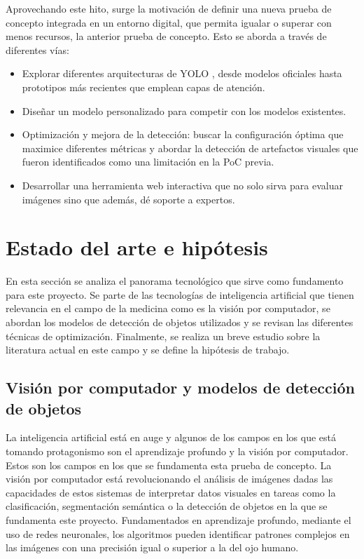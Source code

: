 \documentclass[12pt,a4paper,onecolumn,oneside]{report}
\begin{document}
Aprovechando este hito, surge la motivación de definir una nueva prueba de concepto integrada en un entorno digital, que permita igualar o superar con menos recursos, la anterior prueba de concepto. Esto se aborda a través de diferentes vías:

\begin{itemize}
  \item Explorar diferentes arquitecturas de YOLO \cite{ultralytics_models}, desde modelos oficiales hasta prototipos más recientes que emplean capas de atención. 
  \item Diseñar un modelo personalizado para competir con los modelos existentes.
  \item Optimización y mejora de la detección: buscar la configuración óptima que maximice diferentes métricas y abordar la detección de artefactos visuales que fueron identificados como una limitación en la PoC previa. 
  \item Desarrollar una herramienta web interactiva que no solo sirva para evaluar imágenes sino que además, dé soporte a expertos.
\end{itemize}

\section{Estado del arte e hipótesis}
\label{sec:Estado del arte e hipótesis}

En esta sección se analiza el panorama tecnológico que sirve como fundamento para este proyecto. Se parte de las tecnologías de inteligencia artificial que tienen relevancia en el campo de la medicina como es la 
visión por computador, se abordan los modelos de detección de objetos utilizados y se revisan las diferentes técnicas de optimización. Finalmente, se realiza un breve estudio sobre la literatura actual 
en este campo y se define la hipótesis de trabajo.

\subsection{Visión por computador y modelos de detección de objetos}

La inteligencia artificial está en auge y algunos de los campos en los que está tomando protagonismo son el aprendizaje profundo y la visión por computador. Estos son los campos en los que se fundamenta esta prueba de concepto.
La visión por computador está revolucionando el análisis de imágenes dadas las capacidades de estos sistemas de interpretar datos visuales en tareas como la clasificación, segmentación semántica o la detección de objetos en la que se fundamenta este proyecto.
Fundamentados en aprendizaje profundo, mediante el uso de redes neuronales, los algoritmos pueden identificar patrones complejos en las imágenes con una precisión igual o superior a la del ojo humano. 
\end{document}
